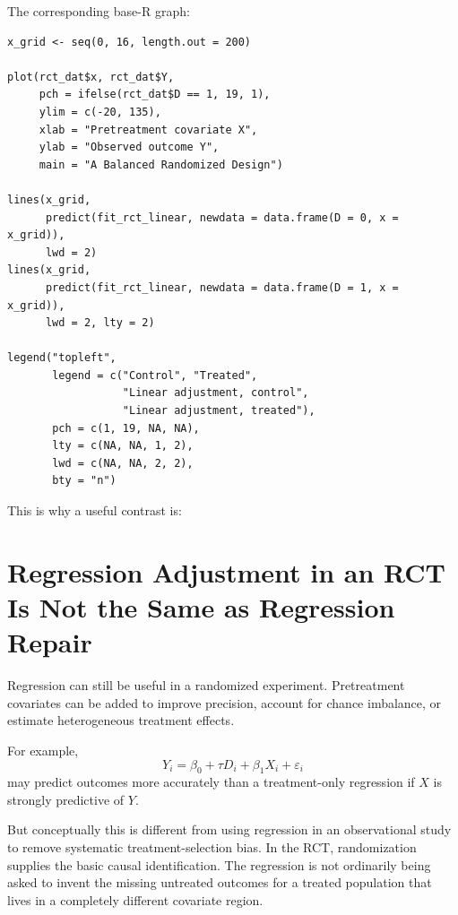 \documentclass[11pt]{report}
\begin{document}
The corresponding base-R graph:

\begin{lstlisting}
x_grid <- seq(0, 16, length.out = 200)

plot(rct_dat$x, rct_dat$Y,
     pch = ifelse(rct_dat$D == 1, 19, 1),
     ylim = c(-20, 135),
     xlab = "Pretreatment covariate X",
     ylab = "Observed outcome Y",
     main = "A Balanced Randomized Design")

lines(x_grid,
      predict(fit_rct_linear, newdata = data.frame(D = 0, x = x_grid)),
      lwd = 2)
lines(x_grid,
      predict(fit_rct_linear, newdata = data.frame(D = 1, x = x_grid)),
      lwd = 2, lty = 2)

legend("topleft",
       legend = c("Control", "Treated",
                  "Linear adjustment, control",
                  "Linear adjustment, treated"),
       pch = c(1, 19, NA, NA),
       lty = c(NA, NA, 1, 2),
       lwd = c(NA, NA, 2, 2),
       bty = "n")
\end{lstlisting}

This is why a useful contrast is:

\begin{center}
\end{center}

\section{Regression Adjustment in an RCT Is Not the Same as Regression Repair}

Regression can still be useful in a randomized experiment. Pretreatment covariates can be added to improve precision, account for chance imbalance, or estimate heterogeneous treatment effects.

For example,
\[
Y_i=\beta_0+\tau D_i+\beta_1X_i+\varepsilon_i
\]
may predict outcomes more accurately than a treatment-only regression if \(X\) is strongly predictive of \(Y\).

But conceptually this is different from using regression in an observational study to remove systematic treatment-selection bias. In the RCT, randomization supplies the basic causal identification. The regression is not ordinarily being asked to invent the missing untreated outcomes for a treated population that lives in a completely different covariate region.
\end{document}
